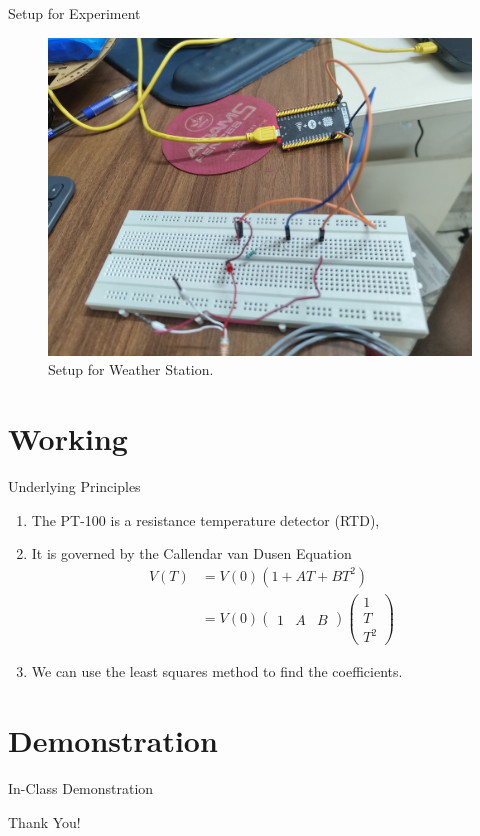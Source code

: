 \documentclass{beamer}
\providecommand{\brak}[1]{\ensuremath{\left(#1\right)}}
\theoremstyle{remark}
\newcommand{\myvec}[1]{\ensuremath{\begin{pmatrix}#1\end{pmatrix}}}
\begin{document}
\begin{frame}{Setup for Experiment}
    \begin{figure}[!ht]
        \centering
        \includegraphics[width=0.6\columnwidth]{figs/esp32.jpg}
        \caption{Setup for Weather Station.}
        \label{fig:setup}
    \end{figure}
\end{frame}

\section{Working}
\begin{frame}{Underlying Principles}
    \begin{enumerate}
        \item The PT-100 is a resistance temperature detector (RTD),
        \pause
        \item It is governed by the Callendar van Dusen Equation
        \begin{align}
            V(T) &= V(0)\brak{1 + AT + BT^2} \\
                 &= V(0)\myvec{1&A&B}\myvec{1\\T\\T^2}
        \end{align}
        \pause
        \item We can use the least squares method to find the coefficients.
    \end{enumerate}
\end{frame}

\section{Demonstration}
\begin{frame}
    \begin{center}
        \Huge In-Class Demonstration
    \end{center}
\end{frame}

\begin{frame}
    \begin{center}
        \Huge Thank You!
    \end{center}
\end{frame}
\end{document}
